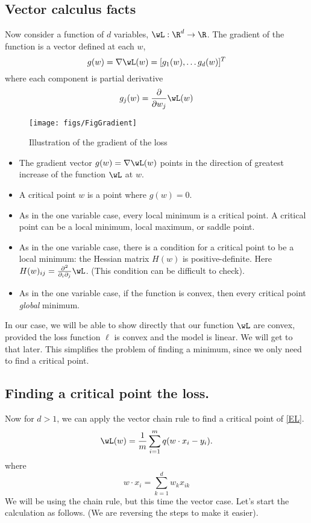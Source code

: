 \documentclass[12pt]{amsart}
\begin{document}
\subsection{Vector calculus facts}
Now consider a function of $d$ variables, $\wL : \R^d \to \R$.
The gradient of the function is a vector defined at each $w$,
\[
g(w) = \nabla \wL(w) = [g_1(w), \dots g_d(w)]^T
\]
where each component is partial derivative
\[
g_j(w) = \frac{\partial}{\partial w_j}\wL(w)
\]

\begin{figure}[hbt]
  \texttt{[image: figs/FigGradient]}
  \caption{Illustration of the gradient of the loss}
  \label{fig:Huber}
\end{figure}

\begin{itemize}
	\item The gradient vector $g(w) = \nabla \wL(w)$ points in the direction of greatest increase of the function $\wL$ at $w$.
	\item A critical point $w$ is a point where $g(w) = 0$. 
	\item As in the one variable case, every local minimum is a critical point.  A critical point can be a local minimum, local maximum, or saddle point.  	
	\item As in the one variable case, there is a condition for a critical point to be a local minimum: the Hessian matrix $H(w)$ is positive-definite.  Here $H(w)_{ij} = \frac{\partial^2}{\partial_i \partial_j}\wL$.  (This condition can be difficult to check). 
	\item As in the one variable case, if the function is convex, then every critical point \emph{global} minimum.
\end{itemize}

\begin{remark}
In our case, we will be able to show directly that our function $\wL$ are convex, provided the loss function $\ell$ is convex and the model is linear.   We will get to that later.  This simplifies the problem of finding a minimum, since we only need to find a critical point. 	
\end{remark}

\subsection{Finding a critical point the loss.}
Now for $d>1$, we can apply the vector chain rule to find a critical point of \eqref{EL}.
\[
\wL(w) = \frac 1 m \sum_{i=1}^m q(w\cdot x_i -y_i).
\]
where 
\[
w\cdot x_i =  \sum_{k=1}^d w_k x_{ik}
\]
We will be using the chain rule, but this time the vector case.
Let's start the calculation as follows.  (We are reversing the steps to make it easier). 
\end{document}
